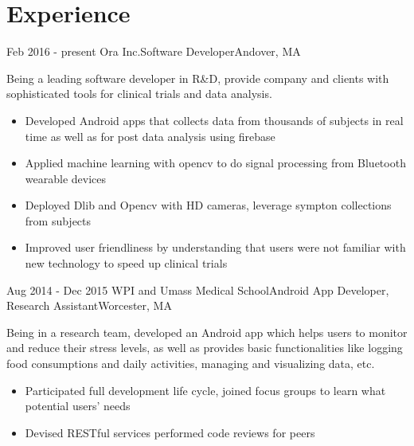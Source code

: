 \documentclass[10pt,a4paper,merriweather]{moderncv}        %
\begin{document}
\makecvtitle
\vspace{-1.5cm}

\section{Experience}

\cventry
{Feb 2016 - present}
{Ora Inc.}{Software Developer}{Andover, MA}{}
{Being a leading software developer in R\&D, provide company and clients with sophisticated tools for clinical trials and data analysis.
\begin{itemize}
\item Developed Android apps that collects data from thousands of subjects in real time as well as for post data analysis using firebase
\item Applied machine learning with opencv to do signal processing from Bluetooth wearable devices
\item Deployed Dlib and Opencv with HD cameras, leverage sympton collections from subjects
\item Improved user friendliness by understanding that users were not familiar with new technology to speed up clinical trials
\end{itemize}}
\vspace{.05cm}

\cventry
{Aug 2014 - Dec 2015}
{WPI and Umass Medical School}{Android App Developer, Research Assistant}{Worcester, MA}{}
{Being in a research team, developed an Android app which helps users to monitor and reduce their stress levels, as well as provides basic functionalities like logging food consumptions and daily activities, managing and visualizing data, etc. 
\begin{itemize}
\item Participated full development life cycle, joined focus groups to learn what potential users' needs
\item Devised RESTful services performed code reviews for peers
\end{itemize}}

\end{document}
